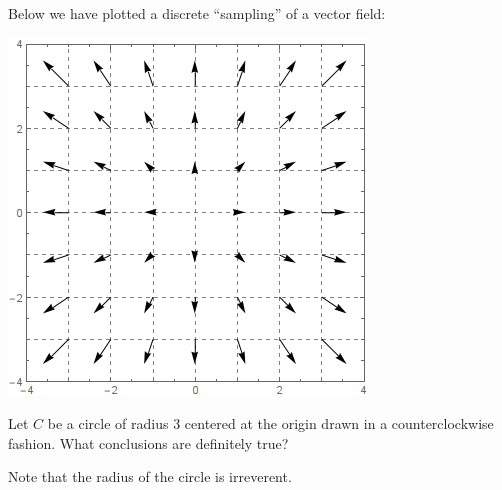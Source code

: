 \documentclass{ximera}
\begin{document}
\begin{exercise}
  Below we have plotted a discrete ``sampling'' of a vector field:
  \begin{image}
    \includegraphics{field4.png}
  \end{image}
  Let $C$ be a circle of radius $3$ centered at the origin drawn in a
  counterclockwise fashion.  What conclusions are definitely true?
  \begin{selectAll}
  \end{selectAll}
  \begin{hint}
    Note that the radius of the circle is irreverent. 
  \end{hint}
\end{exercise}
\end{document}
